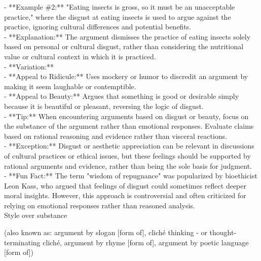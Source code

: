\documentclass[a4paper,12pt,single,pdftex]{scrbook}
\begin{document}
    
      - **Example \#2:** "Eating insects is gross, so it must be an unacceptable practice," where the disgust at eating insects is used to argue against the practice, ignoring cultural differences and potential benefits.
    \\

    
      - **Explanation:** The argument dismisses the practice of eating insects solely based on personal or cultural disgust, rather than considering the nutritional value or cultural context in which it is practiced.
    \\

    
      - **Variation:**
    \\

    
        - **Appeal to Ridicule:** Uses mockery or humor to discredit an argument by making it seem laughable or contemptible.
    \\

    
        - **Appeal to Beauty:** Argues that something is good or desirable simply because it is beautiful or pleasant, reversing the logic of disgust.
    \\

    
      - **Tip:** When encountering arguments based on disgust or beauty, focus on the substance of the argument rather than emotional responses. Evaluate claims based on rational reasoning and evidence rather than visceral reactions.
    \\

    
      - **Exception:** Disgust or aesthetic appreciation can be relevant in discussions of cultural practices or ethical issues, but these feelings should be supported by rational arguments and evidence, rather than being the sole basis for judgment.
    \\

    
      - **Fun Fact:** The term "wisdom of repugnance" was popularized by bioethicist Leon Kass, who argued that feelings of disgust could sometimes reflect deeper moral insights. However, this approach is controversial and often criticized for relying on emotional responses rather than reasoned analysis.
    \\

  

Style over substance
    
      (also known as: argument by slogan [form of], cliché thinking - or thought-terminating cliché, argument by rhyme [form of], argument by poetic language [form of])
    \\
\end{document}
